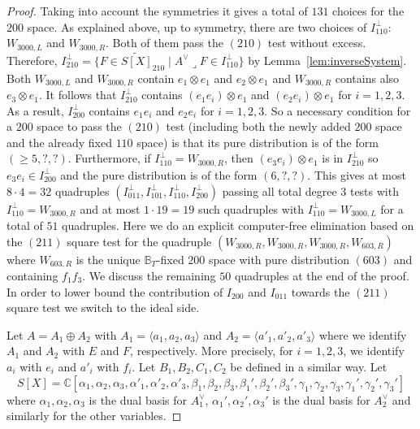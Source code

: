 \documentclass[12pt]{amsart}
\theoremstyle{definition}
\theoremstyle{remark}
\theoremstyle{definition}
\newcommand{\CC}{\mathbb{C}}
\begin{document}
\begin{proof}
Taking into account the symmetries it gives a total of $131$ choices for the $200$ space.
As explained above, up to symmetry, there are two choices of $I_{110}^\perp$: $W_{3000, L}$ and $W_{3000,R}$. Both of them pass the $(210)$ test without excess. 
Therefore, $I_{210}^\perp = \{F\in \widetilde{S[X]}_{210}\mid A^\vee\lrcorner F \in I_{110}^\perp\}$  by Lemma~\ref{lem:inverseSystem}.
Both $W_{3000, L}$ and $W_{3000,R}$ contain $e_1\otimes e_1$ and $e_2\otimes e_1$ and $W_{3000,R}$ contains also $e_3\otimes e_1$. It follows that 
$I_{210}^\perp$ contains $(e_1e_i)\otimes e_1$ and $(e_2e_i)\otimes e_1$ for $i=1,2,3$. As a result, $I_{200}^\perp$ contains $e_1e_i$ and $e_2e_i$ for $i=1,2,3$.
So a necessary condition for a $200$ space to pass the $(210)$ test (including both the newly added $200$ space and the already fixed $110$ space) is that its pure distribution is of the form $(\ge 5,?,?)$. Furthermore, if $I_{110}^\perp = W_{3000,R}$, then $(e_3e_i)\otimes e_1$ is in $I_{210}^\perp$ so $e_3e_i \in I_{200}^\perp$ and the pure distribution is of the form $(6,?,?)$. This gives at most $8\cdot 4 = 32$ quadruples $(I_{011}^\perp, I_{101}^\perp, I_{110}^\perp, I_{200}^\perp)$ passing all total degree $3$ tests with $I_{110}^\perp = W_{3000,R}$ and at most $1\cdot 19 =19$ such quadruples with $I_{110}^\perp = W_{3000,L}$ for a total of $51$ quadruples. Here we do an explicit computer-free elimination based on the $(211)$ square test for the quadruple $(W_{3000,R}, W_{3000,R}, W_{3000,R}, W_{603,R}) $ where $W_{603,R}$ is the unique $\mathbb{B}_T$-fixed $200$ space with pure distribution $(603)$ and containing $f_1f_3$. We discuss the remaining $50$ quadruples at the end of the proof. In order to lower bound the contribution of $I_{200}$ and $I_{011}$ towards the $(211)$ square test we switch to the ideal side. 

Let $A = A_1\oplus A_2$ with $A_1 = \langle a_1,a_2,a_3\rangle$ and $A_2 = \langle a'_1,a'_2,a'_3\rangle$ where we identify $A_1$ and $A_2$ with $E$ and $F$, respectively. More precisely, for $i=1,2,3$, we identify $a_i$ with $e_i$ and $a'_i$ with $f_i$. Let $B_1,B_2, C_1,C_2$ be defined in a similar way. Let 
\[
S[X] = \CC[\alpha_1,\alpha_2,\alpha_3, \alpha'_1, \alpha'_2, \alpha'_3, \beta_1, \beta_2, \beta_3, \beta_1', \beta_2', \beta_3', \gamma_1, \gamma_2, \gamma_3, \gamma_1', \gamma_2', \gamma_3']
\]
where $\alpha_1,\alpha_2,\alpha_3$ is the dual basis for $A_1^\vee$, $\alpha_1', \alpha_2',\alpha_3'$ is the dual basis for $A_2^\vee$ and similarly for the other variables.



\end{proof}
\end{document}
